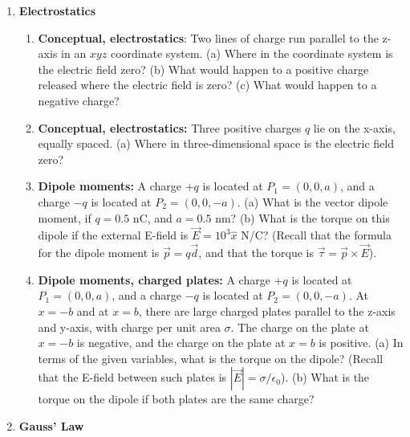 \documentclass[10pt]{article}
\begin{document}
\maketitle

\begin{enumerate}
\item \textbf{Electrostatics}
\begin{enumerate}
\item \textbf{Conceptual, electrostatics}: Two lines of charge run parallel to the z-axis in an $xyz$ coordinate system.  (a) Where in the coordinate system is the electric field zero?  (b) What would happen to a positive charge released where the electric field is zero?  (c) What would happen to a negative charge? \\ \vspace{2.5cm}
\item \textbf{Conceptual, electrostatics:} Three positive charges $q$ lie on the x-axis, equally spaced. (a) Where in three-dimensional space is the electric field zero? \\ \vspace{2.5cm} 
\item \textbf{Dipole moments:} A charge $+q$ is located at $P_1 = (0,0,a)$, and a charge $-q$ is located at $P_2 = (0,0,-a)$.  (a) What is the vector dipole moment, if $q = 0.5$ nC, and $a = 0.5$ nm?  (b) What is the torque on this dipole if the external E-field is $\vec{E} = 10^3 \hat{x}$ N/C? (Recall that the formula for the dipole moment is $\vec{p} = q \vec{d}$, and that the torque is $\vec{\tau} = \vec{p} \times \vec{E}$).  \\ \vspace{2.5cm}
\item \textbf{Dipole moments, charged plates:} A charge $+q$ is located at $P_1 = (0,0,a)$, and a charge $-q$ is located at $P_2 = (0,0,-a)$.  At $x=-b$ and at $x=b$, there are large charged plates parallel to the z-axis and y-axis, with charge per unit area $\sigma$.  The charge on the plate at $x=-b$ is negative, and the charge on the plate at $x=b$ is positive.  (a) In terms of the given variables, what is the torque on the dipole?  (Recall that the E-field between such plates is $|\vec{E}| = \sigma/\epsilon_0$).  (b) What is the torque on the dipole if both plates are the same charge? \\ \vspace{3cm}
\end{enumerate}
\clearpage
\item \textbf{Gauss' Law}
\begin{enumerate}

\end{enumerate}
\end{enumerate}
\end{document}
